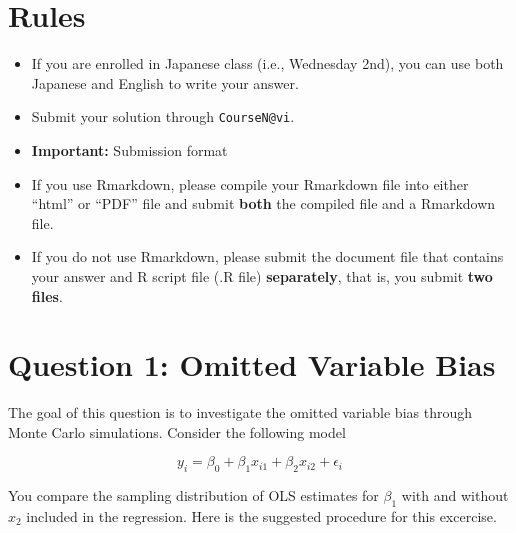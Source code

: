 \documentclass[]{book}
\providecommand{\tightlist}{%
  \setlength{\itemsep}{0pt}\setlength{\parskip}{0pt}}
\begin{document}
\section{Rules}\label{rules}

\begin{itemize}
\tightlist
\item
  If you are enrolled in Japanese class (i.e., Wednesday 2nd), you can
  use both Japanese and English to write your answer.
\item
  Submit your solution through \texttt{CourseN@vi}.
\item
  \textbf{Important:} Submission format
\item
  If you use Rmarkdown, please compile your Rmarkdown file into either
  ``html'' or ``PDF'' file and submit \textbf{both} the compiled file
  and a Rmarkdown file.
\item
  If you do not use Rmarkdown, please submit the document file that
  contains your answer and R script file (.R file) \textbf{separately},
  that is, you submit \textbf{two files}.
\end{itemize}

\section{Question 1: Omitted Variable
Bias}\label{question-1-omitted-variable-bias}

The goal of this question is to investigate the omitted variable bias
through Monte Carlo simulations. Consider the following model

\[
y_i = \beta_0 + \beta_1 x_{i1} + \beta_2 x_{i2} + \epsilon_i
\]

You compare the sampling distribution of OLS estimates for \(\beta_1\)
with and without \(x_2\) included in the regression. Here is the
suggested procedure for this excercise.
\end{document}
